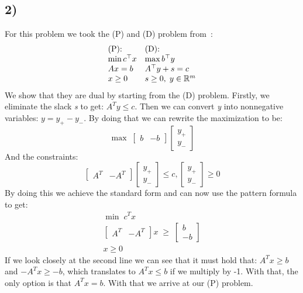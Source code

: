\documentclass[9pt]{IEEEtran}
\begin{document}
\subsection*{2)}
For this problem we took the (P) and (D) problem from~\cite{mehlhorn2016still}:
\[
\begin{array}{l l}
\centering
\text{(P):} & \text{(D):} \\
\min c^\top x & \max b^\top y \\
Ax = b & A^\top y + s = c \\
x \ge 0 & s \ge 0, \; y \in \mathbb{R}^m
\end{array}
\]
We show that they are dual by starting from the (D) problem. Firstly, 
we eliminate the slack \textit{s} to get: $A^T y \le c$. Then we can 
convert \textit{y} into nonnegative variables: $y = y_+ - y_-$. By doing that 
we can rewrite the maximization to be:
\[
\max \;
\begin{bmatrix}
    b & -b
\end{bmatrix}
\begin{bmatrix}
    y_+ \\ y_-
\end{bmatrix}
\]
And the constraints:
\[
\begin{bmatrix}
    A^T & -A^T
\end{bmatrix}
\begin{bmatrix}
    y_+ \\ y_-
\end{bmatrix} \le c, \begin{bmatrix}
    y_+ \\ y_-
\end{bmatrix} \ge 0
\]
By doing this we achieve the standard form and can now use the pattern formula 
to get: 
\[
\begin{aligned}
    \min \; c^T x \\[6pt]
    \begin{bmatrix}
        A^T & -A^T
    \end{bmatrix} x \;\ge\;
    \begin{bmatrix}
        b \\ -b
    \end{bmatrix} \\[6pt]
    x \ge 0
\end{aligned}
\]
If we look closely at the second line we can see that it must hold that:
$A^T x \ge b $ and $-A^T x \ge -b$, which translates to  $A^T x \le b$ if 
we multiply by -1. With that, the only option is that $A^T x = b$. With that 
we arrive at our (P) problem. 
\end{document}
